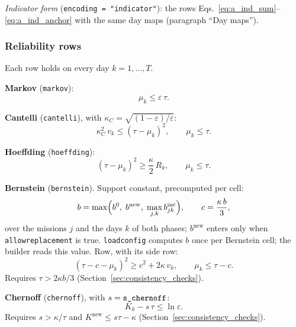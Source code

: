 \documentclass[11pt,a4paper]{article}
\theoremstyle{plain}
\theoremstyle{definition}
\newcommand{\inc}{\mathrm{inc}}
\newcommand{\new}{\mathrm{new}}
\renewcommand{\_}{\textunderscore\allowbreak{}}
\begin{document}
\emph{Indicator form} (\texttt{encoding = "indicator"}): the rows
Eqs.~\eqref{eq:a_ind_sum}--\eqref{eq:a_ind_anchor} with the same day maps (paragraph
``Day maps'').

\subsubsection{Reliability rows}

Each row holds on every day $k = 1, \ldots, T$.

\textbf{Markov} (\texttt{markov}):
\begin{equation}
  \mu_k \leq \varepsilon\,\tau.
  \label{eq:rf_markov}
\end{equation}

\textbf{Cantelli} (\texttt{cantelli}), with $\kappa_C = \sqrt{(1-\varepsilon)/\varepsilon}$:
\begin{equation}
  \kappa_C^2\, v_k \leq (\tau - \mu_k)^2, \qquad \mu_k \leq \tau.
  \label{eq:rf_cantelli}
\end{equation}

\textbf{Hoeffding} (\texttt{hoeffding}):
\begin{equation}
  (\tau - \mu_k)^2 \geq \frac{\kappa}{2}\, R_k, \qquad \mu_k \leq \tau.
  \label{eq:rf_hoeffding}
\end{equation}

\textbf{Bernstein} (\texttt{bernstein}). Support constant, precomputed per cell:
\begin{equation}
  b = \max\Bigl(b^0,\; b^{\new},\; \max_{j,k} b^{\inc}_{jk}\Bigr), \qquad
  c = \frac{\kappa\, b}{3},
  \label{eq:rf_bsupport}
\end{equation}
over the missions $j$ and the days $k$ of both phases; $b^{\new}$ enters only when
\texttt{allow\_replacement} is true. \texttt{load\_config} computes $b$ once per Bernstein cell;
the builder reads this value. Row, with its side row:
\begin{equation}
  (\tau - c - \mu_k)^2 \geq c^2 + 2\kappa\, v_k, \qquad \mu_k \leq \tau - c.
  \label{eq:rf_bernstein}
\end{equation}
Requires $\tau > 2\kappa b/3$ (Section~\ref{sec:consistency_checks}).

\textbf{Chernoff} (\texttt{chernoff}), with $s = \texttt{s\_chernoff}$:
\begin{equation}
  K_k - s\,\tau \leq \ln\varepsilon.
  \label{eq:rf_chernoff}
\end{equation}
Requires $s > \kappa/\tau$ and $K^{\new} \leq s\tau - \kappa$
(Section~\ref{sec:consistency_checks}).
\end{document}
